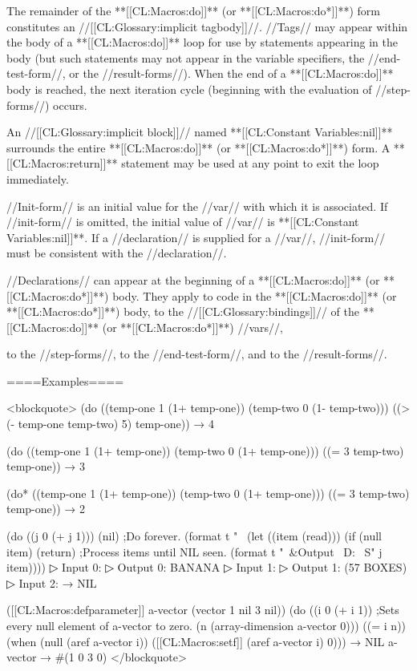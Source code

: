 The remainder of the **[[CL:Macros:do]]** (or **[[CL:Macros:do*]]**) form constitutes an //[[CL:Glossary:implicit tagbody]]//. //Tags// may appear within the body of a **[[CL:Macros:do]]** loop for use by  statements appearing in the body (but such  statements may not appear in the variable specifiers, the //end-test-form//, or the //result-forms//). When the end of a **[[CL:Macros:do]]** body is reached, the next iteration cycle (beginning with the evaluation of //step-forms//) occurs.

An //[[CL:Glossary:implicit block]]// named **[[CL:Constant Variables:nil]]** surrounds the entire **[[CL:Macros:do]]** (or **[[CL:Macros:do*]]**) form. A **[[CL:Macros:return]]** statement may be used at any point to exit the loop immediately.

//Init-form// is an initial value for the //var// with which it is associated. If //init-form// is omitted, the initial value of //var// is **[[CL:Constant Variables:nil]]**. If a //declaration// is supplied for a //var//, //init-form// must be consistent with the //declaration//.

//Declarations// can appear at the beginning of a **[[CL:Macros:do]]** (or **[[CL:Macros:do*]]**) body. They apply to code in the **[[CL:Macros:do]]** (or **[[CL:Macros:do*]]**) body, to the //[[CL:Glossary:bindings]]// of the **[[CL:Macros:do]]** (or **[[CL:Macros:do*]]**) //vars//,

to the //step-forms//, to the //end-test-form//, and to the //result-forms//.

====Examples====

<blockquote> (do ((temp-one 1 (1+ temp-one)) (temp-two 0 (1- temp-two))) ((> (- temp-one temp-two) 5) temp-one)) → 4

(do ((temp-one 1 (1+ temp-one)) (temp-two 0 (1+ temp-one))) ((= 3 temp-two) temp-one)) → 3

(do* ((temp-one 1 (1+ temp-one)) (temp-two 0 (1+ temp-one))) ((= 3 temp-two) temp-one)) → 2

(do ((j 0 (+ j 1))) (nil) ;Do forever. (format t "~ (let ((item (read))) (if (null item) (return) ;Process items until NIL seen. (format t "~&Output ~D: ~S" j item))))
▷ Input 0: 
▷ Output 0: BANANA
▷ Input 1: 
▷ Output 1: (57 BOXES)
▷ Input 2:  → NIL

([[CL:Macros:defparameter]] a-vector (vector 1 nil 3 nil)) (do ((i 0 (+ i 1)) ;Sets every null element of a-vector to zero. (n (array-dimension a-vector 0))) ((= i n)) (when (null (aref a-vector i)) ([[CL:Macros:setf]] (aref a-vector i) 0))) → NIL a-vector → #(1 0 3 0) </blockquote>

